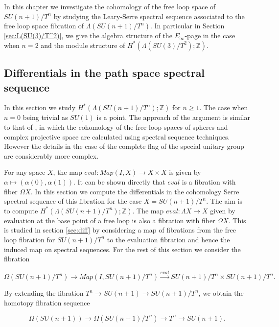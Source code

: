 \documentclass{article}
\theoremstyle{plain}
\theoremstyle{definition}
\numberwithin{thm}{section}
\begin{document}
		In this chapter we investigate the cohomology of the free loop space of $SU(n+1)/T^n$ by studying the Leary-Serre spectral sequence associated to the free
		loop space fibration of $\Lambda(SU(n+1)/T^n)$.
		In particular in Section \ref{sec:L(SU(3)/T^2)}, we give the algebra structure of the $E_\infty$-page in the case when $n=2$
		and the module structure of $H^*(\Lambda(SU(3)/T^2);\mathbb{Z})$.
		
		\subsection{Differentials in the path space spectral sequence}\label{sec:evalSS}
			
					In this section we study $H^{*}(\Lambda(SU(n+1)/T^n);\mathbb{Z})$ for $n \geq 1$.
			The case when $n=0$ being trivial as $SU(1)$ is a point.
			The approach of the argument is similar to that of \cite{cohololgy_Lprojective},
			in which the cohomology of the free loop spaces of spheres and complex projective space are calculated using spectral sequence techniques. 
			However the details in the case of the complete flag of the special unitary group are considerably more complex.

			For any space $X$, the map $eval \colon Map(I,X) \to X\times X$ is given by $\alpha \mapsto (\alpha(0),\alpha(1))$.
			It can be shown directly that $eval$ is a fibration with fiber $\Omega X$.
			In this section we compute the differentials in the cohomology Serre spectral sequence of this fibration for the case $X=SU(n+1)/T^n$.
			The aim is to compute $H^{*}(\Lambda(SU(n+1)/T^n);\mathbb{Z})$.
			The map $eval \colon \Lambda X \to X$ given by evaluation at the base point of a free loop is also a fibration with fiber
			$\Omega X$.
			This is studied in section \ref{sec:diff} by considering a map of fibrations from the free loop fibration for $SU(n+1)/T^n$ to the evaluation fibration
			and hence the induced map on spectral sequences. For the rest of this section we consider the fibration
			
			\begin{equation}\label{eq:evalfib}
				\Omega (SU(n+1)/T^n) \to Map(I,SU(n+1)/T^n) \xrightarrow{eval} SU(n+1)/T^n\times SU(n+1)/T^n. 
			\end{equation}
			
			By extending the fibration $T^n \to SU(n+1) \to SU(n+1)/T^n$, we obtain the homotopy fibration sequence
			
			\begin{equation}\label{eq:SU/Tfib}
			\Omega(SU(n+1)) \to \Omega(SU(n+1)/T^n) \to T^n \to SU(n+1).
			\end{equation}
			
\end{document}
